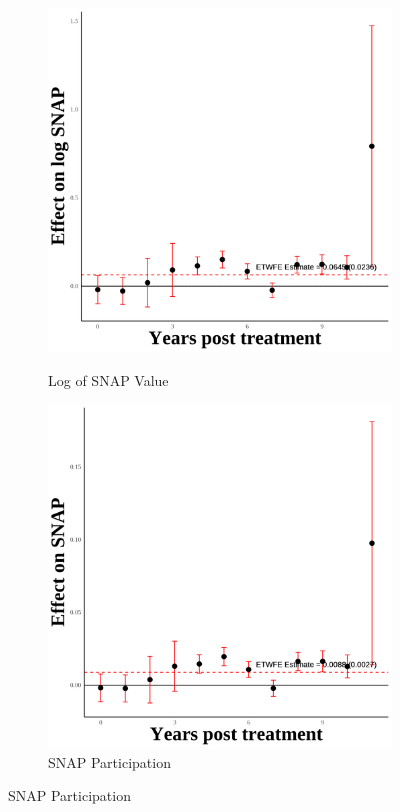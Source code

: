 \documentclass[12pt,english]{article}
\begin{document}
\begin{figure}[H]
  \vspace{0.3cm} %

  \begin{subfigure}[b]{0.3\textwidth}
    \centering
    \caption{Log of SNAP Value}
    \includegraphics[width=\linewidth]{figures/plot52-ln_snap_event_study-third.png}
    \label{fig:ln-snap-third}
  \end{subfigure}
  \hfill
  \begin{subfigure}[b]{0.3\textwidth}
    \centering
    \caption{SNAP Participation}
    \includegraphics[width=\linewidth]{figures/plot53-snap_event_study-third.png}

\end{subfigure}
\end{figure}
\end{document}
